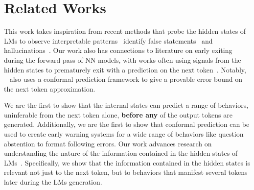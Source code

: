 \section{Related Works}
\label{sec:related}
This work takes inspiration from recent methods that probe the hidden states of LMs to observe interpretable patterns~\citep{alain2017understanding,Kim2017InterpretabilityBF, petroni2019language, hewitt-liang-2019-designing, akyrek2023what} identify false statements~\citep{azaria-mitchell-2023-internal, li2023inferencetime, liu-etal-2024-universal, yuksekgonul2024attention} and hallucinations~\citep{chuang-etal-2024-lookback, su-etal-2024-unsupervised, jiang2024large}. Our work also has connections to literature on early exiting during the forward pass of NN models, with works often using signals from the hidden states to prematurely exit with a prediction on the next token~\citep{xin-etal-2020-deebert, zhou2020bert, xin-etal-2021-berxit, schuster-etal-2021-consistent, jazbec2023towards}. Notably, ~\citet{schuster-etal-2021-consistent} also uses a conformal prediction framework to give a provable error bound on the next token approximation. 

We are the first to show that the internal states can predict a range of behaviors, uninferable from the next token alone, \textbf{before any} of the output tokens are generated. Additionally, we are the first to show that conformal prediction can be used to create early warning systems for a wide range of behaviors like question abstention to format following errors. Our work advances research on understanding the nature of the information contained in the hidden states of LMs~\citep{petroni2019language, anonymous2023does, nylund-etal-2024-time, liu-etal-2024-probing, tighidet-etal-2024-probing}. Specifically, we show that the information contained in the hidden states is relevant not just to the next token, but to behaviors that manifest several tokens later during the LMs generation. 